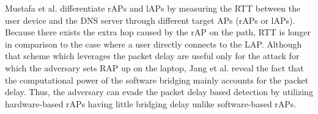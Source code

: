 \documentclass[conference]{IEEEtran}
\begin{document}
Mustafa et al. \cite{rtt} differentiate rAPs and lAPs by measuring the RTT between the user device and the DNS server through different target APs (rAPs or lAPs).
Because there exists the extra hop caused by the rAP on the path, RTT is longer in comparison to the case where a user directly connects to the LAP.
Although that scheme which leverages the packet delay are useful only for the attack for which the adversary sets RAP up on the laptop, Jang et al. \cite{previous} reveal the fact that the computational power of the software bridging mainly accounts for the packet delay.
Thus, the adversary can evade the packet delay based detection by utilizing hardware-based rAPs having little bridging delay unlike software-based rAPs.
\end{document}
